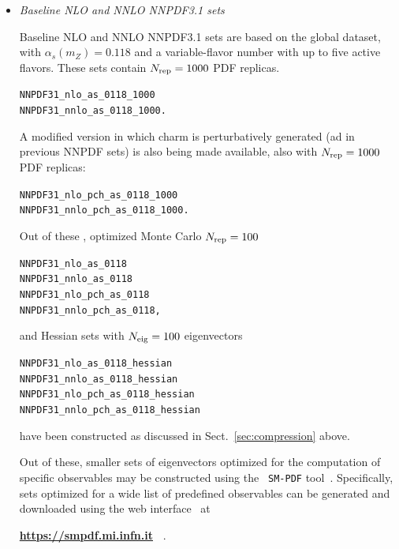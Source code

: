 \begin{itemize}

\item {\it Baseline NLO and NNLO NNPDF3.1 sets}

Baseline NLO and NNLO NNPDF3.1 sets are based on the global
dataset, with $\alpha_s(m_Z)=0.118$ and a variable-flavor number with
up to five active flavors. These sets contain $N_{\rm rep}=1000$ PDF replicas. 
\begin{flushleft}
\tt NNPDF31\_nlo\_as\_0118\_1000 \\
\tt NNPDF31\_nnlo\_as\_0118\_1000.\\
\end{flushleft}
A modified version in which charm is perturbatively generated (ad in
previous NNPDF sets) is also being made available, also with $N_{\rm rep}=1000$ PDF replicas:
\begin{flushleft}
\tt NNPDF31\_nlo\_pch\_as\_0118\_1000 \\
\tt NNPDF31\_nnlo\_pch\_as\_0118\_1000.\\
\end{flushleft}
Out of these , optimized  Monte Carlo $N_{\rm rep}=100$ 
\begin{flushleft}
\tt NNPDF31\_nlo\_as\_0118 \\
\tt NNPDF31\_nnlo\_as\_0118 \\
\tt NNPDF31\_nlo\_pch\_as\_0118 \\
\tt NNPDF31\_nnlo\_pch\_as\_0118,
\end{flushleft}
and  Hessian sets with $N_{\rm eig}=100$ eigenvectors 
\begin{flushleft}
\tt NNPDF31\_nlo\_as\_0118\_hessian \\
\tt NNPDF31\_nnlo\_as\_0118\_hessian \\
\tt NNPDF31\_nlo\_pch\_as\_0118\_hessian \\
\tt NNPDF31\_nnlo\_pch\_as\_0118\_hessian
\end{flushleft}
have been constructed as discussed in Sect.~\ref{sec:compression}
above. 

Out of these, smaller sets of eigenvectors optimized for the
computation of specific observables may be constructed using the {\tt
  SM-PDF} tool~\cite{Carrazza:2016htc}.
Specifically, sets optimized for a wide list of predefined observables
can be generated and downloaded using the web
interface~\cite{Carrazza:2016wte}  at
\begin{center}
{\bf \url{https://smpdf.mi.infn.it}~} .
\end{center}






\end{itemize}
